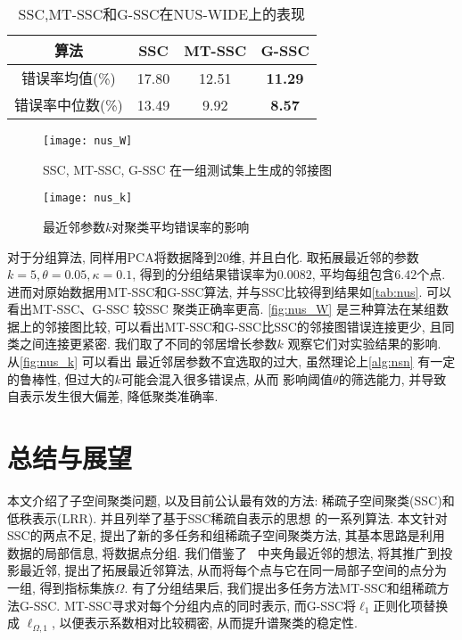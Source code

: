 \begin{table}[tb]
  \centering
  \begin{tabular}{|c | c | c | c |}
	\hline
	  算法 & SSC & MT-SSC & G-SSC \\	\hline  \hline
      错误率均值(\%) & 17.80 & 12.51 & \textbf{11.29} \\	\hline
      错误率中位数(\%) & 13.49 & 9.92 & \textbf{8.57} \\	\hline
  \end{tabular}
  \caption{SSC,MT-SSC和G-SSC在NUS-WIDE上的表现}
  \label{tab:nus}
\end{table}
\begin{figure}[t]
  \centering
  \texttt{[image: nus\_W]}
  \caption{SSC, MT-SSC, G-SSC 在一组测试集上生成的邻接图}
  \label{fig:nus_W}
\end{figure}
\begin{figure}[t!]
  \centering
  \texttt{[image: nus\_k]}
  \caption{最近邻参数\(k\)对聚类平均错误率的影响}
  \label{fig:nus_k}
\end{figure}
对于分组算法, 同样用PCA将数据降到20维, 并且白化.
取拓展最近邻的参数\(k=5, \theta=0.05, \kappa=0.1\),
得到的分组结果错误率为\(0.0082\), 平均每组包含\(6.42\)个点.
进而对原始数据用MT-SSC和G-SSC算法,
并与SSC比较得到结果如\autoref{tab:nus}.
可以看出MT-SSC、G-SSC 较SSC 聚类正确率更高.
\autoref{fig:nus_W} 是三种算法在某组数据上的邻接图比较,
可以看出MT-SSC和G-SSC比SSC的邻接图错误连接更少,
且同类之间连接更紧密. 我们取了不同的邻居增长参数\(k\)
观察它们对实验结果的影响. 从\autoref{fig:nus_k} 可以看出
最近邻居参数不宜选取的过大, 虽然理论上\autoref{alg:nsn} 
有一定的鲁棒性, 但过大的\(k\)可能会混入很多错误点, 从而
影响阈值\(\theta\)的筛选能力, 并导致自表示发生很大偏差,
降低聚类准确率.

\chapter{总结与展望}
本文介绍了子空间聚类问题, 以及目前公认最有效的方法:
稀疏子空间聚类(SSC)和低秩表示(LRR). 并且列举了基于SSC稀疏自表示的思想
的一系列算法. 本文针对SSC的两点不足, 提出了新的多任务和组稀疏子空间聚类方法,
其基本思路是利用数据的局部信息, 将数据点分组. 我们借鉴了~\cite{heckel2013noisy}
中夹角最近邻的想法, 将其推广到投影最近邻, 提出了拓展最近邻算法,
从而将每个点与它在同一局部子空间的点分为一组, 得到指标集族\(\Omega\).
有了分组结果后, 我们提出多任务方法MT-SSC和组稀疏方法G-SSC.
MT-SSC寻求对每个分组内点的同时表示, 而G-SSC将\(\ell_1\)正则化项替换成
\(\ell_{\Omega, 1}\), 以便表示系数相对比较稠密, 从而提升谱聚类的稳定性.

